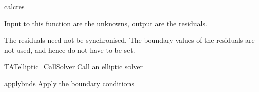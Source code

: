 \begin{FunctionDescription}{calcres}{}
\begin{Discussion}
Input to this function are the unknowns, output are the residuals.

The residuals need not be synchronised.  The boundary values of the
residuals are not used, and hence do not have to be set.
\end{Discussion}

\begin{SeeAlsoSection}
\begin{SeeAlso}{TATelliptic\_CallSolver}
Call an elliptic solver
\end{SeeAlso}
\begin{SeeAlso}{applybnds}
Apply the boundary conditions
\end{SeeAlso}
\end{SeeAlsoSection}

\end{FunctionDescription}



